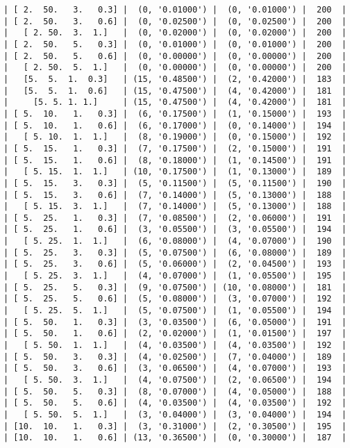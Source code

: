 \documentclass{article}
\begin{document}
\begin{verbatim}
| [ 2.  50.   3.   0.3] |  (0, '0.01000') |  (0, '0.01000') |  200  |
| [ 2.  50.   3.   0.6] |  (0, '0.02500') |  (0, '0.02500') |  200  |
|   [ 2. 50.  3.  1.]   |  (0, '0.02000') |  (0, '0.02000') |  200  |
| [ 2.  50.   5.   0.3] |  (0, '0.01000') |  (0, '0.01000') |  200  |
| [ 2.  50.   5.   0.6] |  (0, '0.00000') |  (0, '0.00000') |  200  |
|   [ 2. 50.  5.  1.]   |  (0, '0.00000') |  (0, '0.00000') |  200  |
|   [5.  5.  1.  0.3]   | (15, '0.48500') |  (2, '0.42000') |  183  |
|   [5.  5.  1.  0.6]   | (15, '0.47500') |  (4, '0.42000') |  181  |
|     [5. 5. 1. 1.]     | (15, '0.47500') |  (4, '0.42000') |  181  |
| [ 5.  10.   1.   0.3] |  (6, '0.17500') |  (1, '0.15000') |  193  |
| [ 5.  10.   1.   0.6] |  (6, '0.17000') |  (0, '0.14000') |  194  |
|   [ 5. 10.  1.  1.]   |  (8, '0.19000') |  (0, '0.15000') |  192  |
| [ 5.  15.   1.   0.3] |  (7, '0.17500') |  (2, '0.15000') |  191  |
| [ 5.  15.   1.   0.6] |  (8, '0.18000') |  (1, '0.14500') |  191  |
|   [ 5. 15.  1.  1.]   | (10, '0.17500') |  (1, '0.13000') |  189  |
| [ 5.  15.   3.   0.3] |  (5, '0.11500') |  (5, '0.11500') |  190  |
| [ 5.  15.   3.   0.6] |  (7, '0.14000') |  (5, '0.13000') |  188  |
|   [ 5. 15.  3.  1.]   |  (7, '0.14000') |  (5, '0.13000') |  188  |
| [ 5.  25.   1.   0.3] |  (7, '0.08500') |  (2, '0.06000') |  191  |
| [ 5.  25.   1.   0.6] |  (3, '0.05500') |  (3, '0.05500') |  194  |
|   [ 5. 25.  1.  1.]   |  (6, '0.08000') |  (4, '0.07000') |  190  |
| [ 5.  25.   3.   0.3] |  (5, '0.07500') |  (6, '0.08000') |  189  |
| [ 5.  25.   3.   0.6] |  (5, '0.06000') |  (2, '0.04500') |  193  |
|   [ 5. 25.  3.  1.]   |  (4, '0.07000') |  (1, '0.05500') |  195  |
| [ 5.  25.   5.   0.3] |  (9, '0.07500') | (10, '0.08000') |  181  |
| [ 5.  25.   5.   0.6] |  (5, '0.08000') |  (3, '0.07000') |  192  |
|   [ 5. 25.  5.  1.]   |  (5, '0.07500') |  (1, '0.05500') |  194  |
| [ 5.  50.   1.   0.3] |  (3, '0.03500') |  (6, '0.05000') |  191  |
| [ 5.  50.   1.   0.6] |  (2, '0.02000') |  (1, '0.01500') |  197  |
|   [ 5. 50.  1.  1.]   |  (4, '0.03500') |  (4, '0.03500') |  192  |
| [ 5.  50.   3.   0.3] |  (4, '0.02500') |  (7, '0.04000') |  189  |
| [ 5.  50.   3.   0.6] |  (3, '0.06500') |  (4, '0.07000') |  193  |
|   [ 5. 50.  3.  1.]   |  (4, '0.07500') |  (2, '0.06500') |  194  |
| [ 5.  50.   5.   0.3] |  (8, '0.07000') |  (4, '0.05000') |  188  |
| [ 5.  50.   5.   0.6] |  (4, '0.03500') |  (4, '0.03500') |  192  |
|   [ 5. 50.  5.  1.]   |  (3, '0.04000') |  (3, '0.04000') |  194  |
| [10.  10.   1.   0.3] |  (3, '0.31000') |  (2, '0.30500') |  195  |
| [10.  10.   1.   0.6] | (13, '0.36500') |  (0, '0.30000') |  187  |

\end{verbatim}
\end{document}
